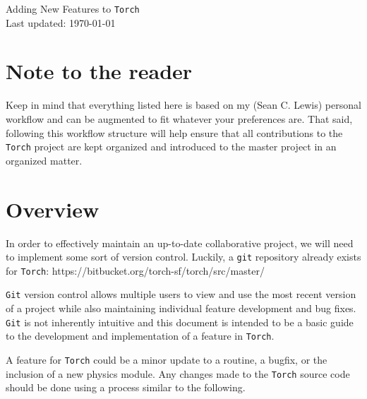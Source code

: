 \documentclass[10pt]{article}
\begin{document}
\begin{center}
Adding New Features to \texttt{Torch} \\
Last updated: \today \\
\end{center}





\section{Note to the reader}
Keep in mind that everything listed here is based on my (Sean C. Lewis) personal workflow and can be augmented to fit whatever your preferences are. 
That said, following this workflow structure will help ensure that all contributions to the \texttt{Torch} project are kept organized and introduced to the master project in an organized matter.

\section{Overview}
In order to effectively maintain an up-to-date collaborative project, we will need to implement some sort of version control. Luckily, a \texttt{git} repository already exists for \texttt{Torch}: https://bitbucket.org/torch-sf/torch/src/master/

\texttt{Git} version control allows multiple users to view and use the most recent version of a project while also maintaining individual feature development and bug fixes. \texttt{Git} is not inherently intuitive and this document is intended to be a basic guide to the development and implementation of a feature in \texttt{Torch}. 

A feature for \texttt{Torch} could be a minor update to a routine, a bugfix, or the inclusion of a new physics module. Any changes made to the \texttt{Torch} source code should be done using a process similar to the following.
\end{document}

